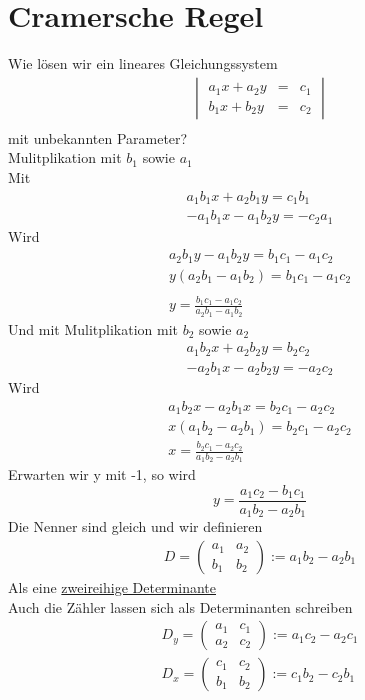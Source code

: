\section{Cramersche Regel}
Wie lösen wir ein lineares Gleichungssystem
\begin{eqnarray*}
	\begin{vmatrix}a_1x + a_2y &=& c_1\\ 
	b_1x+b_2y &=& c_2\end{vmatrix}\\
\end{eqnarray*}
mit unbekannten Parameter?\\
Mulitplikation mit $b_1$ sowie $a_1$\\
Mit 
\begin{eqnarray*}
	a_1b_1x+a_2b_1y = c_1b_1\\
	-a_1b_1x -a_1b_2y = - c_2a_1
\end{eqnarray*}
Wird 
\begin{eqnarray*}
	a_2b_1y -a_1b_2y = b_1c_1-a_1c_2\\
	y(a_2b_1 -a_1b_2)= b_1c_1-a_1c_2\\
	\\
	y = \frac{b_1c_1-a_1c_2}{a_2b_1 -a_1b_2}
\end{eqnarray*}
Und mit 
Mulitplikation mit $b_2$ sowie $a_2$\\
\begin{eqnarray*}
	a_1b_2x+a_2b_2y = b_2c_2\\
	-a_2b_1x -a_2b_2y = - a_2c_2
\end{eqnarray*}
Wird
\begin{eqnarray*}
	a_1b_2x -a_2b_1x = b_2c_1-a_2c_2\\
	x(a_1b_2 -a_2b_1) = b_2c_1-a_2c_2\\
	x = \frac{b_2c_1-a_2c_2}{a_1b_2 -a_2b_1}
\end{eqnarray*}
Erwarten wir y mit -1, so wird
\begin{equation*}
	y = \frac{a_1c_2-b_1c_1}{a_1b_2-a_2b_1}
\end{equation*}
Die Nenner sind gleich und wir definieren
\begin{eqnarray*}
	D = 
	\begin{pmatrix}a_1 &a_2\\ 
	b_1 & b_2\end{pmatrix} := a_1b_2 -a_2b_1
\end{eqnarray*}
Als eine \underline{zweireihige Determinante}\\
Auch die Zähler lassen sich als Determinanten schreiben
\begin{eqnarray*}
	D_y = 
	\begin{pmatrix}a_1 &c_1\\ 
	a_2 & c_2\end{pmatrix} := a_1c_2-a_2c_1\\ 
	D_x = 
	\begin{pmatrix}c_1 &c_2\\ 
	b_1 & b_2\end{pmatrix} := c_1b_2-c_2b_1
\end{eqnarray*}
